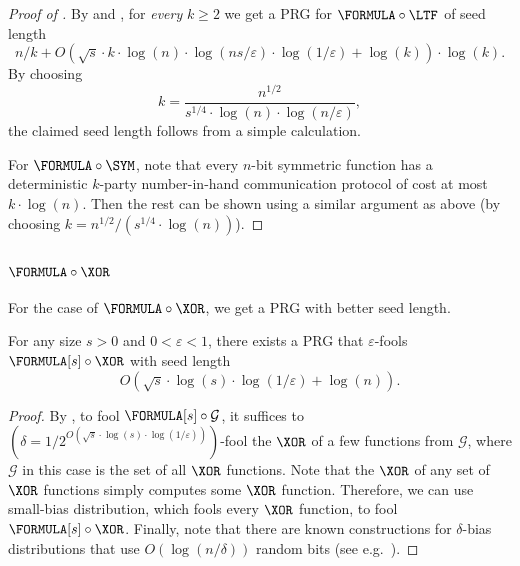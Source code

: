 	\begin{proof}[Proof of ]
	    By  and , for \emph{every} $k\geq 2$ we get a PRG for $\FORMULA\circ\LTF$ of seed length
        \[
    		n/k+O\left(\sqrt{s}\cdot k\cdot \log(n) \cdot\log(ns/\varepsilon)\cdot\log(1/\varepsilon)+\log(k)\right)\cdot\log(k).
    	\]
	    By choosing 
	    \[
	        k=\frac{n^{1/2}}{s^{1/4}\cdot\log(n)\cdot\log(n/\varepsilon)},
	    \]
	    the claimed seed length follows from a simple calculation.
	
	    For $\FORMULA\circ\SYM$, note that every $n$-bit symmetric function has a deterministic $k$-party number-in-hand communication protocol of cost at most $k\cdot\log(n)$. Then the rest can be shown using a similar argument as above (by choosing $k=n^{1/2}/\left(s^{1/4}\cdot\log(n)\right)$).
	\end{proof}

%
       
%

%
%
%
%
%
%

    \subsubsection{\texorpdfstring{$\FORMULA\circ\XOR$}{FORMULA-XOR}}
    
    For the case of $\FORMULA\circ\XOR$, we get a PRG with better seed length. 
    
	\begin{theorem}\label{thm:prg-formula-xor}
		For any size $s>0$ and $0<\varepsilon<1$, there exists a PRG that $\varepsilon$-fools $\FORMULA[s]\circ \XOR$ with seed length
		\[
			O\left(\sqrt{s}\cdot\log(s)\cdot\log(1/\varepsilon)+\log(n)\right).
		\]
	\end{theorem}
	
	\begin{proof}
	    By , to fool $\FORMULA[s]\circ\mathcal{G}$, it suffices to $\left(\delta=1/2^{O\left(\sqrt{s}\cdot\log (s)\cdot \log(1/\varepsilon)\right)}\right)$-fool the $\XOR$ of a few functions from $\mathcal{G}$, where $\mathcal{G}$ in this case is the set of all $\XOR$ functions. Note that the $\XOR$ of any set of $\XOR$ functions simply computes some $\XOR$ function. Therefore, we can use small-bias distribution, which fools every $\XOR$ function, to fool $\FORMULA[s]\circ\XOR$. Finally, note that there are known constructions for $\delta$-bias distributions that use $O(\log(n/\delta))$ random bits (see e.g.~\cite{AGHP92}).
	\end{proof}
	
